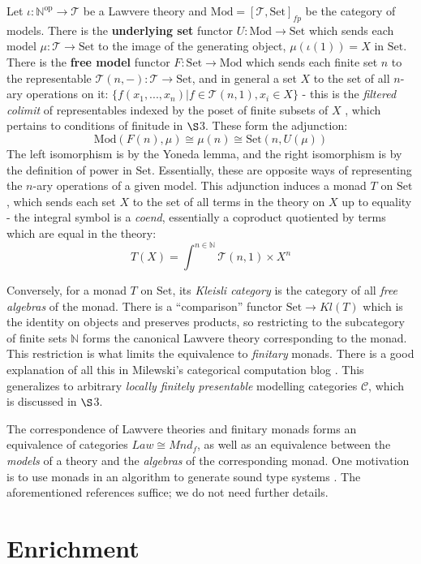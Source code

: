 \documentclass[a4paper,UKenglish]{article}
\theoremstyle{definition}
\newcommand{\Set}{\mathrm{Set}}
\newcommand{\Mod}{\mathrm{Mod}}
\newcommand{\op}{\mathrm{op}}
\newcommand{\NN}{\mathbb{N}}
\newcommand{\C}{\mathscr{C}}
\newcommand{\T}{\mathscr{T}}
\begin{document}
Let $\iota: \NN^\op \to \T$ be a Lawvere theory and $\Mod = [\T,\Set]_{fp}$ be the category of models. There is the \textbf{underlying set} functor $U:\Mod \to \Set$ which sends each model $\mu: \T \to \Set$ to the image of the generating object, $\mu(\iota(1)) = X$ in $\Set$. There is the \textbf{free model} functor $F:\Set \to \Mod$ which sends each finite set $n$ to the representable $\T(n,-):\T \to \Set$, and in general a set $X$ to the set of all $n$-ary operations on it: $\{f(x_1,...,x_n)|f\in \T(n,1), x_i\in X\}$ - this is the \textit{filtered colimit} of representables indexed by the poset of finite subsets of $X$ \cite{nlab}, which pertains to conditions of finitude in $\S$3. These form the adjunction: $$\Mod(F(n),\mu) \cong \mu(n) \cong \Set(n,U(\mu))$$ The left isomorphism is by the Yoneda lemma, and the right isomorphism is by the definition of power in $\Set$. Essentially, these are opposite ways of representing the $n$-ary operations of a given model. This adjunction induces a monad $T$ on $\Set$, which sends each set $X$ to the set of all terms in the theory on $X$ up to equality - the integral symbol is a \textit{coend}, essentially a coproduct quotiented by terms which are equal in the theory: $$T(X) = \int^{n\in \NN} \T(n,1) \times X^n$$

Conversely, for a monad $T$ on $\Set$, its \textit{Kleisli category} is the category of all \textit{free algebras} of the monad. There is a ``comparison'' functor $\Set \to Kl(T)$ which is the identity on objects and preserves products, so restricting to the subcategory of finite sets $\NN$ forms the canonical Lawvere theory corresponding to the monad. This restriction is what limits the equivalence to \textit{finitary} monads. There is a good explanation of all this in Milewski's categorical computation blog \cite{milew}. This generalizes to arbitrary \textit{locally finitely presentable} modelling categories $\C$, which is discussed in $\S$3.

The correspondence of Lawvere theories and finitary monads forms an equivalence of categories $Law \cong Mnd_f$, as well as an equivalence between the \textit{models} of a theory and the \textit{algebras} of the corresponding monad. One motivation is to use monads in an algorithm to generate sound type systems \cite{ladl}. The aforementioned references suffice; we do not need further details. 

\section{Enrichment}
\end{document}
